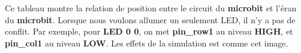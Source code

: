 \documentclass[14px]{article}
\begin{document}
\begin{figure}[htbp]
\end{figure}
Ce tableau montre la relation de position entre le circuit du  \textbf{microbit} et l'éran du \textbf{microbit}.
\clearpage
Lorsque nous voulons allumer un seulement LED, il n'y a pas de conflit. Par exemple, pour \textbf{LED 0 0}, on met \textbf{pin\_row1} au niveau \textbf{HIGH}, et \textbf{pin\_col1} au niveau \textbf{LOW}. Les effets de la simulation est comme cet image.\\
\begin{figure}[htbp]
\end{figure}\\
\end{document}
